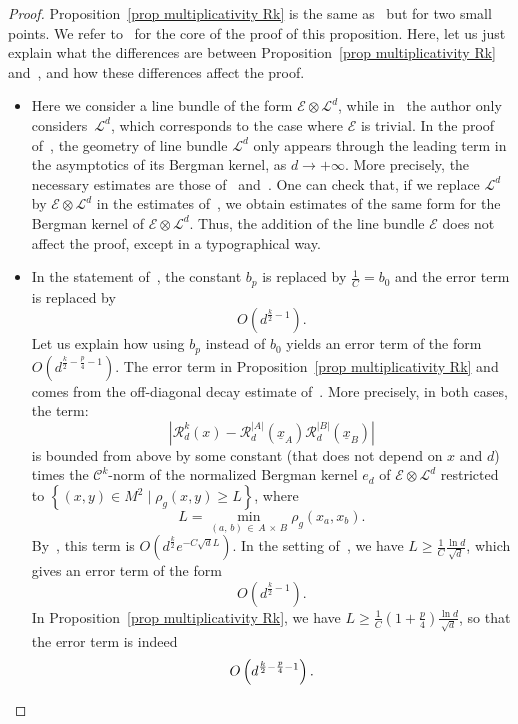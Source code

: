 \documentclass[10pt]{amsart}
\theoremstyle{definition}\newtheorem{defi}[theo]{Definition}\newtheorem{rema}[theo]{Remark}\newtheorem{exam}[theo]{Example}\newtheorem{exem}[theo]{Example}\newtheorem{nota}[theo]{Notation}
\newcommand{\E}{\mathcal{E}}
\renewcommand{\L}{\mathcal{L}}
\newcommand{\clC}{\mathcal{C}}
\newcommand{\clR}{\mathcal{R}}
\newcommand{\norm}[1]{\left\lvert #1 \right\rvert}
\renewcommand{\geq}{\geqslant}
\begin{document}
\begin{proof}
Proposition~\ref{prop multiplicativity Rk} is the same as~\cite[Proposition~3.2]{Anc2019} but for two small points. We refer to~\cite{Anc2019} for the core of the proof of this proposition. Here, let us just explain what the differences are between Proposition~\ref{prop multiplicativity Rk} and~\cite[Proposition~3.2]{Anc2019}, and how these differences affect the proof.
\begin{itemize}
\item Here we consider a line bundle of the form $\E \otimes \L^d$, while in~\cite{Anc2019} the author only considers~$\L^d$, which corresponds to the case where $\E$ is trivial. In the proof of~\cite[Proposition~3.2]{Anc2019}, the geometry of line bundle $\L^d$ only appears through the leading term in the asymptotics of its Bergman kernel, as $d \to +\infty$. More precisely, the necessary estimates are those of~\cite[Theorem~4.2.1]{MM2007} and~\cite[Theorem~1]{MM2015}. One can check that, if we replace $\L^d$ by $\E \otimes \L^d$ in the estimates of~\cite{MM2007,MM2015}, we obtain estimates of the same form for the Bergman kernel of $\E \otimes \L^d$. Thus, the addition of the line bundle $\E$ does not affect the proof, except in a typographical way.

\item In the statement of~\cite[Proposition~3.2]{Anc2019}, the constant $b_p$ is replaced by $\tfrac{1}{C}=b_0$ and the error term is replaced by
\[
O\left(d^{\frac{k}{2}-1}\right).
\]
Let us explain how using $b_p$ instead of $b_0$ yields an error term of the form $O(d^{\frac{k}{2}-\frac{p}{4}-1})$. The error term in Proposition~\ref{prop multiplicativity Rk} and~\cite[Proposition~3.2]{Anc2019} comes from the off-diagonal decay estimate of~\cite[Theorem~1]{MM2015}. More precisely, in both cases, the term:
\[
\norm{\clR^k_d(x) - \clR^{\norm{A}}_d(\underline{x}_A)\clR^{\norm{B}}_d(\underline{x}_B)}
\]
is bounded from above by some constant (that does not depend on $x$ and $d$) times the $\clC^k$-norm of the normalized Bergman kernel $e_d$ of $\E \otimes \L^d$ restricted to $\left\{(x,y) \in M^2 \mid \rho_g(x,y) \geq L \right\}$, where
\[
L = \min_{(a,\,b)\,\in\,A\,\times\,B} \rho_g(x_a,x_b).
\]
By~\cite[Theorem~1]{MM2015}, this term is $O(d^\frac{k}{2}e^{-C\sqrt{d}L})$. In the setting of~\cite[Proposition~3.2]{Anc2019}, we have $L \geq \tfrac{1}{C} \tfrac{\ln d}{\sqrt{d}}$, which gives an error term of the form
\[
O\left(d^{\frac{k}{2}-1}\right).
\]
In Proposition~\ref{prop multiplicativity Rk}, we have $L \geq \frac{1}{C}(1+\frac{p}{4})\tfrac{\ln d}{\sqrt{d}}$, so that the error term is indeed 
\[
O\left(d^{\frac{k}{2}-\frac{p}{4}-1}\right).\qedhere
\]
\end{itemize}
\end{proof}
\end{document}
